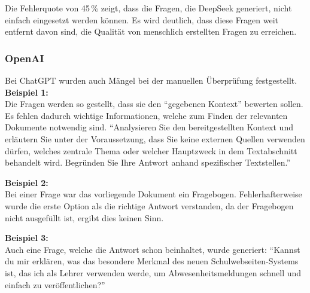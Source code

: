Die Fehlerquote von 45\,\% zeigt, dass die Fragen, die DeepSeek generiert, nicht einfach eingesetzt werden können.
Es wird deutlich, dass diese Fragen weit entfernt davon sind, die Qualität von menschlich erstellten Fragen zu erreichen.

\subsubsection{OpenAI}

Bei ChatGPT wurden auch Mängel bei der manuellen Überprüfung festgestellt. \\

\textbf{Beispiel 1:}\\
Die Fragen werden so gestellt, dass sie den \enquote{gegebenen Kontext} bewerten sollen. Es fehlen dadurch wichtige Informationen, welche zum Finden der relevanten Dokumente notwendig sind.
\enquote{Analysieren Sie den bereitgestellten Kontext und erläutern Sie unter der Voraussetzung, dass Sie keine externen Quellen verwenden dürfen, welches zentrale Thema oder welcher Hauptzweck in dem Textabschnitt behandelt wird. Begründen Sie Ihre Antwort anhand spezifischer Textstellen.}

\textbf{Beispiel 2:}\\
Bei einer Frage war das vorliegende Dokument ein Fragebogen. Fehlerhafterweise wurde die erste Option als die richtige Antwort verstanden, da der Fragebogen nicht ausgefüllt ist, ergibt dies keinen Sinn.

\textbf{Beispiel 3:}\\
Auch eine Frage, welche die Antwort schon beinhaltet, wurde generiert:
\enquote{Kannst du mir erklären, was das besondere Merkmal des neuen Schulwebseiten-Systems ist, das ich als Lehrer verwenden werde, um Abwesenheitsmeldungen schnell und einfach zu veröffentlichen?}

